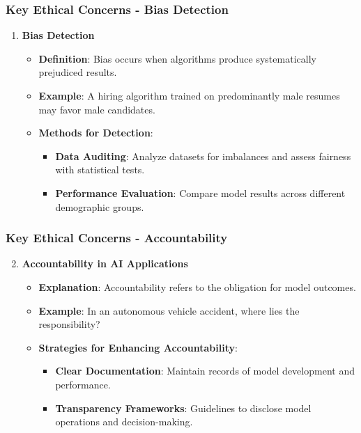 \documentclass{beamer}
\begin{document}
\begin{frame}[fragile]
    \frametitle{Key Ethical Concerns - Bias Detection}
    \begin{enumerate}
        \item \textbf{Bias Detection}
            \begin{itemize}
                \item \textbf{Definition}: Bias occurs when algorithms produce systematically prejudiced results.
                \item \textbf{Example}: A hiring algorithm trained on predominantly male resumes may favor male candidates.
                \item \textbf{Methods for Detection}:
                    \begin{itemize}
                        \item \textbf{Data Auditing}: Analyze datasets for imbalances and assess fairness with statistical tests.
                        \item \textbf{Performance Evaluation}: Compare model results across different demographic groups.
                    \end{itemize}
            \end{itemize}
    \end{enumerate}
\end{frame}

\begin{frame}[fragile]
    \frametitle{Key Ethical Concerns - Accountability}
    \begin{enumerate}
        \setcounter{enumi}{1} %
        \item \textbf{Accountability in AI Applications}
            \begin{itemize}
                \item \textbf{Explanation}: Accountability refers to the obligation for model outcomes.
                \item \textbf{Example}: In an autonomous vehicle accident, where lies the responsibility?
                \item \textbf{Strategies for Enhancing Accountability}:
                    \begin{itemize}
                        \item \textbf{Clear Documentation}: Maintain records of model development and performance.
                        \item \textbf{Transparency Frameworks}: Guidelines to disclose model operations and decision-making.
                    \end{itemize}
            \end{itemize}
    \end{enumerate}
\end{frame}
\end{document}
